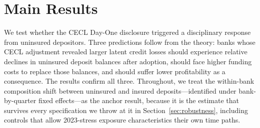 
\section{Main Results}
\label{sec:results}

We test whether the CECL Day-One disclosure triggered a disciplinary response from
uninsured depositors.  Three predictions follow from the theory: banks whose CECL
adjustment revealed larger latent credit losses should experience relative declines
in uninsured deposit balances after adoption, should face higher funding costs to
replace those balances, and should suffer lower profitability as a consequence.
The results confirm all three.  Throughout, we treat the within-bank
composition shift between uninsured and insured deposits---identified under
bank-by-quarter fixed effects---as the anchor result, because it is the
estimate that survives every specification we throw at it in
Section~\ref{sec:robustness}, including controls that allow 2023-stress
exposure characteristics their own time paths.

